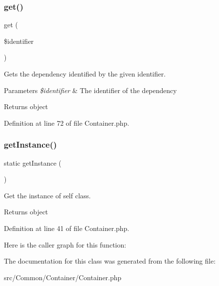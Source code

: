 \mbox{\label{class_zest_1_1_common_1_1_container_1_1_container_a711e1d65eb5a7930db612a76ea3bddab}} 
\subsubsection{\texorpdfstring{get()}{get()}}
{\footnotesize\ttfamily get (\begin{DoxyParamCaption}\item[{}]{\$identifier }\end{DoxyParamCaption})}

Gets the dependency identified by the given identifier.


\begin{DoxyParams}{Parameters}
{\em \$identifier} & The identifier of the dependency\\
\hline
\end{DoxyParams}
\begin{DoxyReturn}{Returns}
object 
\end{DoxyReturn}


Definition at line 72 of file Container.\+php.

\mbox{\label{class_zest_1_1_common_1_1_container_1_1_container_ac93fbec81f07e5d15f80db907e63dc10}} 
\subsubsection{\texorpdfstring{get\+Instance()}{getInstance()}}
{\footnotesize\ttfamily static get\+Instance (\begin{DoxyParamCaption}{ }\end{DoxyParamCaption})\hspace{0.3cm}{\ttfamily [static]}}

Get the instance of self class.

\begin{DoxyReturn}{Returns}
object 
\end{DoxyReturn}


Definition at line 41 of file Container.\+php.

Here is the caller graph for this function\+:


The documentation for this class was generated from the following file\+:\begin{DoxyCompactItemize}
\item 
src/\+Common/\+Container/Container.\+php\end{DoxyCompactItemize}
